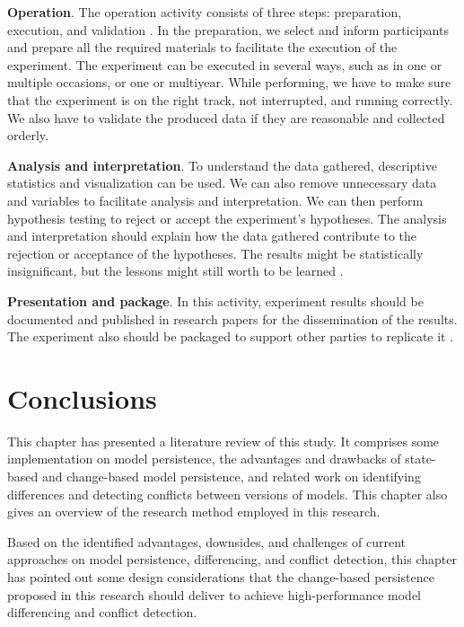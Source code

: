 \textbf{Operation}. The operation activity consists of three steps: preparation, execution, and validation \cite{DBLP:books/daglib/0029933/Wohlin}. 
In the preparation, we select and inform participants and prepare all the required materials to facilitate the execution of the experiment. The experiment can be executed in several ways, such as in one or multiple occasions, or one or multiyear.  While performing, we have to make sure that the experiment is on the right track, not interrupted, and running correctly. We also have to validate the produced data if they are reasonable and collected orderly.

\textbf{Analysis and interpretation}.
To understand the data gathered, descriptive statistics and visualization can be used. We can also remove unnecessary data and variables to facilitate analysis and interpretation. We can then perform hypothesis testing to reject or accept the experiment's hypotheses. The analysis and interpretation should explain how the data gathered contribute to the rejection or acceptance of the hypotheses. The results might be statistically insignificant, but the lessons might still worth to be learned \cite{DBLP:books/daglib/0029933/Wohlin}. 

\textbf{Presentation and package}. In this activity, experiment results should be documented and published in research papers for the dissemination of the results. The experiment also should be packaged to support other parties to replicate it \cite{DBLP:books/daglib/0029933/Wohlin}. 

\section{Conclusions}
\label{sec:conclusions_2}
This chapter has presented a literature review of this study. It comprises some implementation on model persistence, the advantages and drawbacks of state-based and change-based model persistence, and related work on identifying differences and detecting conflicts between versions of models. This chapter also gives an overview of the research method employed in this research. 

Based on the identified advantages, downsides, and challenges of current approaches on model persistence, differencing, and conflict detection, this chapter has pointed out some design considerations that the change-based persistence proposed in this research should deliver to achieve high-performance model differencing and conflict detection.
